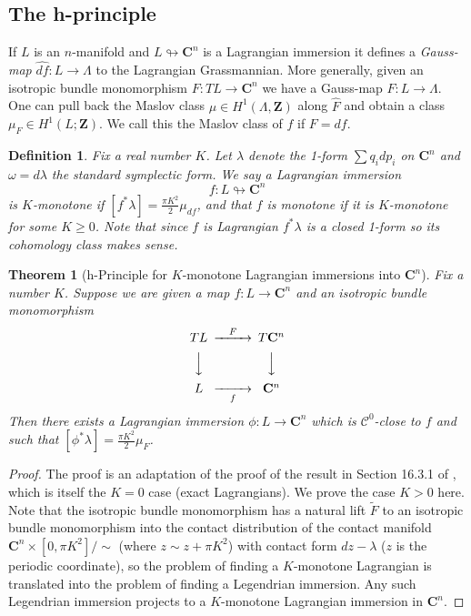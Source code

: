 \documentclass{amsart}
\newcommand{\mC}{\mathcal{C}}
\newcommand{\CC}{\mathbf{C}}
\newcommand{\ZZ}{\mathbf{Z}}
\newtheorem{dfn}[thm]{Definition}
\newtheorem{thmmain}{Theorem}
\begin{document}
\subsection{The h-principle}
If $L$ is an $n$-manifold and $L\looparrowright\CC^n$ is a Lagrangian immersion it defines a \emph{Gauss-map} $\widehat{df}:L\rightarrow\Lambda$ to the Lagrangian Grassmannian. More generally, given an isotropic bundle monomorphism $F:TL\rightarrow\CC^n$ we have a Gauss-map $\hat{F}:L\rightarrow\Lambda$. One can pull back the Maslov class $\mu\in H^1(\Lambda,\ZZ)$ along $\hat{F}$ and obtain a class $\mu_F\in H^1(L;\ZZ)$. We call this the Maslov class of $f$ if $F=df$.
\begin{dfn}
Fix a real number $K$. Let $\lambda$ denote the 1-form $\sum q_idp_i$ on $\CC^n$ and $\omega=d\lambda$ the standard symplectic form. We say a Lagrangian immersion
\[f\colon L\looparrowright\CC^n\]
is $K$-monotone if $[f^*\lambda]=\frac{\pi K^2}{2}\mu_{df}$, and that $f$ is monotone if it is $K$-monotone for some $K\geq 0$. Note that since $f$ is Lagrangian $f^*\lambda$ is a closed 1-form so its cohomology class makes sense.\end{dfn}
\begin{thmmain}[h-Principle for $K$-monotone Lagrangian immersions into $\CC^n$]
Fix a number $K$. Suppose we are given a map $f:L\rightarrow \CC^n$ and an isotropic bundle monomorphism
\[
\begin{CD}
TL@>{F}>>T\CC^n\\
@VVV @VVV\\
L@>>{f}>\CC^n
\end{CD}
\]
Then there exists a Lagrangian immersion $\phi:L\rightarrow\CC^n$ which is $\mC^0$-close to $f$ and such that $[\phi^*\lambda]=\frac{\pi K^2}{2}\mu_F$.
\end{thmmain}
\begin{proof}
The proof is an adaptation of the proof of the result in Section 16.3.1 of \cite{EM}, which is itself the $K=0$ case (exact Lagrangians). We prove the case $K>0$ here. Note that the isotropic bundle monomorphism has a natural lift $\tilde{F}$ to an isotropic bundle monomorphism into the contact distribution of the contact manifold $\CC^n\times [0,\pi K^2]/\sim$ (where $z\sim z+\pi K^2$) with contact form $dz-\lambda$ ($z$ is the periodic coordinate), so the problem of finding a $K$-monotone Lagrangian is translated into the problem of finding a Legendrian immersion. Any such Legendrian immersion projects to a $K$-monotone Lagrangian immersion in $\CC^n$.
\end{proof}
\end{document}
